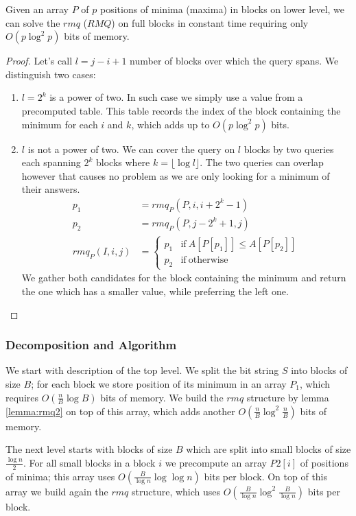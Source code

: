 \begin{lemma}\label{lemma:rmq2}
Given an array $P$ of $p$ positions of minima (maxima) in blocks on lower level, we can solve the $rmq$ ($RMQ$) on full blocks in constant time requiring only $O(p \log^2 p)$ bits of memory.
\end{lemma}
\begin{proof}
Let's call $l = j - i + 1$ number of blocks over which the query spans.
We distinguish two cases:
\begin{enumerate}
	\item $l = 2^k$ is a power of two.
	In such case we simply use a value from a precomputed table.
	This table records the index of the block containing the minimum for each $i$ and $k$, which adds up to $O(p \log^2 p)$ bits.
	\item $l$ is not a power of two.
	We can cover the query on $l$ blocks by two queries each spanning $2^k$ blocks where $k = \lfloor \log l \rfloor$.
	The two queries can overlap however that causes no problem as we are only looking for a minimum of their answers.
	\begin{align*}
	p_1 &= rmq_P(P, i, i + 2^k - 1) \\
	p_2 &= rmq_P(P, j - 2^k + 1, j) \\
	rmq_P(I, i, j) &=
	\begin{cases}
	p_1 & \textrm{if}\ A[P[p_1]] \le A[P[p_2]]\\
	p_2 & \textrm{if}\ \textrm{otherwise}
	\end{cases}
	\end{align*}
	We gather both candidates for the block containing the minimum and return the one which has a smaller value, while preferring the left one.
\end{enumerate}
\end{proof}

\subsubsection{Decomposition and Algorithm}

We start with description of the top level.
We split the bit string $S$ into blocks of size $B$; for each block we store position of its minimum in an array $P_1$, which requires $O(\frac{n}{B} \log B)$ bits of memory.
We build the $rmq$ structure by lemma \ref{lemma:rmq2} on top of this array, which adds another $O(\frac{n}{B} \log^2 \frac{n}{B})$ bits of memory.

The next level starts with blocks of size $B$ which are split into small blocks of size $\frac{\log n}{2}$.
For all small blocks in a block $i$ we precompute an array $P2[i]$ of positions of minima; this array uses $O(\frac{B}{\log n} \log \log n)$ bits per block.
On top of this array we build again the $rmq$ structure, which uses $O(\frac{B}{\log n} \log^2 \frac{B}{\log n})$ bits per block.

